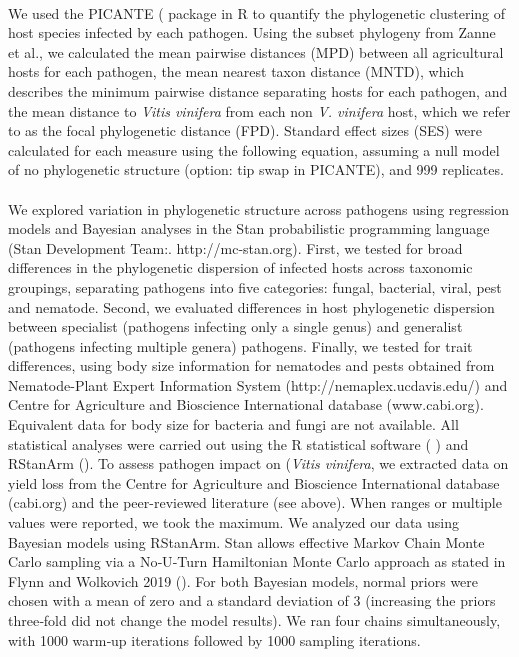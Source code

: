 \documentclass{article}
\begin{document}
\paragraph{}We used the PICANTE (\citep{PICANTE} package in R to quantify the phylogenetic clustering of host species infected by each pathogen. Using the subset phylogeny from Zanne et al.\citep{Zanne2014}, we calculated the mean pairwise distances (MPD) between all agricultural hosts for each pathogen, the mean nearest taxon distance (MNTD), which describes the minimum pairwise distance separating hosts for each pathogen, and the mean distance to \textit{Vitis vinifera} from each non \textit{V. vinifera} host, which we refer to as the focal phylogenetic distance (FPD). Standard effect sizes (SES) were calculated for each measure using the following equation, assuming a null model of no phylogenetic structure (option: tip swap in PICANTE), and 999 replicates.

\paragraph{}We explored variation in phylogenetic structure across pathogens using regression models and Bayesian analyses in the Stan probabilistic programming language (Stan Development Team:. http://mc-stan.org). First, we tested for broad differences in the phylogenetic dispersion of infected hosts across taxonomic groupings, separating pathogens into five categories: fungal, bacterial, viral, pest and nematode. Second, we evaluated differences in host phylogenetic dispersion between specialist (pathogens infecting only a single genus) and generalist (pathogens infecting multiple genera) pathogens. Finally, we tested for trait differences, using body size information for nematodes and pests obtained from Nematode-Plant Expert Information System (http://nemaplex.ucdavis.edu/) and Centre for Agriculture and Bioscience International database (www.cabi.org). Equivalent data for body size for bacteria and fungi are not available. All statistical analyses were carried out using the R statistical software (\citep{R}
) and RStanArm (\citep{RSTANARM}). To assess pathogen impact on (\textit{Vitis vinifera}, we extracted data on yield loss from the Centre for Agriculture and Bioscience International database (cabi.org) and the peer-reviewed literature (see above). When ranges or multiple values were reported, we took the maximum. We analyzed our data using Bayesian models using RStanArm. Stan allows effective Markov Chain Monte Carlo sampling via a No‐U‐Turn Hamiltonian Monte Carlo approach as stated in Flynn and Wolkovich 2019 (\citep{Flynn2018a}). For both Bayesian models, normal priors were chosen with a mean of zero and a standard deviation of 3 (increasing the priors three‐fold did not change the model results). We ran four chains simultaneously, with 1000 warm‐up iterations followed by 1000 sampling iterations.
\end{document}
